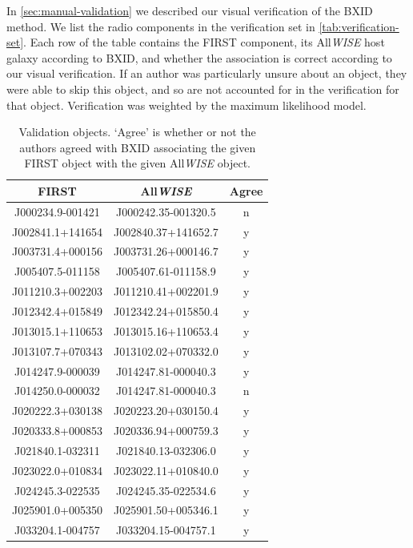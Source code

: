   In \autoref{sec:manual-validation} we described our visual verification of the BXID method. We list the radio components in the verification set in \autoref{tab:verification-set}. Each row of the table contains the FIRST component, its All\emph{WISE} host galaxy according to BXID, and whether the association is correct according to our visual verification. If an author was particularly unsure about an object, they were able to skip this object, and so are not accounted for in the verification for that object. Verification was weighted by the \citet{dawid79em} maximum likelihood model.

  \begin{table}
    \caption{\label{tab:verification-set} Validation objects. `Agree' is whether or not the authors agreed with BXID associating the given FIRST object with the given All\emph{WISE} object.}
      \begin{tabular}{ccc}
        FIRST & All\emph{WISE} & Agree\\\hline
        J000234.9-001421 & J000242.35-001320.5 & n\\
        J002841.1+141654 & J002840.37+141652.7 & y\\
        J003731.4+000156 & J003731.26+000146.7 & y\\
        J005407.5-011158 & J005407.61-011158.9 & y\\
        J011210.3+002203 & J011210.41+002201.9 & y\\
        J012342.4+015849 & J012342.24+015850.4 & y\\
        J013015.1+110653 & J013015.16+110653.4 & y\\
        J013107.7+070343 & J013102.02+070332.0 & y\\
        J014247.9-000039 & J014247.81-000040.3 & y\\
        J014250.0-000032 & J014247.81-000040.3 & n\\
        J020222.3+030138 & J020223.20+030150.4 & y\\
        J020333.8+000853 & J020336.94+000759.3 & y\\
        J021840.1-032311 & J021840.13-032306.0 & y\\
        J023022.0+010834 & J023022.11+010840.0 & y\\
        J024245.3-022535 & J024245.35-022534.6 & y\\
        J025901.0+005350 & J025901.50+005346.1 & y\\
        J033204.1-004757 & J033204.15-004757.1 & y\\

\end{tabular}
\end{table}

